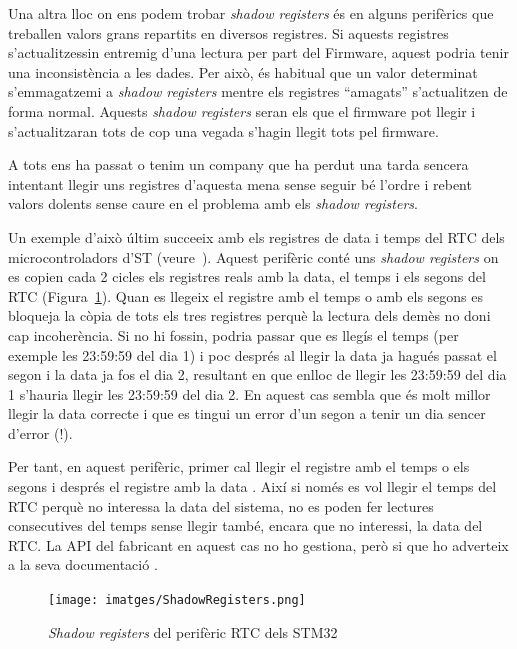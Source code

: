 Una altra lloc on ens podem trobar {\em shadow registers} és en alguns perifèrics que treballen valors grans repartits en diversos registres. Si aquests registres s'actualitzessin entremig d'una lectura per part del Firmware, aquest podria tenir una inconsistència a les dades. Per això, és habitual que un valor determinat s'emmagatzemi a {\em shadow registers} mentre els registres ``amagats'' s'actualitzen de forma normal. Aquests {\em shadow registers} seran els que el firmware pot llegir i s'actualitzaran tots de cop una vegada s'hagin llegit tots pel firmware. 

\begin{remark}
 A tots ens ha passat o tenim un company que ha perdut una tarda sencera intentant llegir uns registres d'aquesta mena sense seguir bé l'ordre i rebent valors dolents sense caure en el problema amb els {\em shadow registers}.
\end{remark}

Un exemple d'això últim succeeix amb els registres de data i temps del RTC dels microcontroladors d'ST (veure~). Aquest perifèric conté uns {\em shadow registers} on es copien cada 2 cicles els registres reals amb la data, el temps i els segons del RTC (Figura~\ref{fig:ShadowRegisters}). Quan es llegeix el registre amb el temps o amb els segons es bloqueja la còpia de tots els tres registres perquè la lectura dels demès no doni cap incoherència. Si no hi fossin, podria passar que es llegís el temps (per exemple les 23:59:59 del dia 1) i poc després al llegir la data ja hagués passat el segon i la data ja fos el dia 2, resultant en que enlloc de llegir les 23:59:59 del dia 1 s'hauria llegir les 23:59:59 del dia 2. En aquest cas sembla que és molt millor llegir la data correcte i que es tingui un error d'un segon a tenir un dia sencer d'error (!).

Per tant, en aquest perifèric, primer cal llegir el registre amb el temps o els segons i després el registre amb la data \cite[800-805]{STM32F4RM}. Així si només es vol llegir el temps del RTC perquè no interessa la data del sistema, no es poden fer lectures consecutives del temps sense llegir també, encara que no interessi, la data del RTC. La API del fabricant en aquest cas no ho gestiona, però si que ho adverteix a la seva documentació \cite[719]{STM32UM1725}.

\begin{figure}
 \centering
 \texttt{[image: imatges/ShadowRegisters.png]}
 \caption{{\em Shadow registers} del perifèric RTC dels STM32 \cite[800]{STM32F4RM}}
 \label{fig:ShadowRegisters}
\end{figure}


